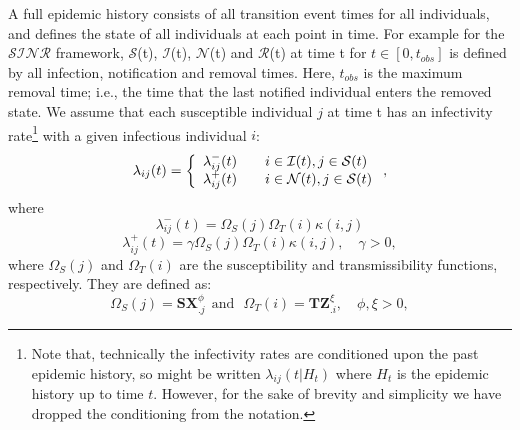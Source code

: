 \documentclass[nojss,shortnames]{jss}
\begin{document}

A full epidemic history consists of all transition event times for all individuals, and defines the state of all individuals at each point in time. For example for the $\mathcal{SINR}$ framework, $\mathcal{S}$(t), $\mathcal{I}$(t), $\mathcal{N}$(t) and $\mathcal{R}$(t) at time t for $t \in [0,t_{obs}]$ is defined by all infection, notification and removal times. Here, $t_{obs}$ is the maximum removal time; i.e., the time that the last notified individual enters the removed state. We assume that each susceptible individual $j$ at time t has an infectivity rate\footnote{Note that, technically the infectivity rates are conditioned upon the past epidemic history, so might be written $\lambda_{ij}(t|H_{t})$ where $H_{t}$ is the epidemic history up to time $t$. However, for the sake of brevity and simplicity we have dropped the conditioning from the notation.} with a given infectious individual $i$: 
\begin{equation}
\lambda_{ij}(t) = \left\{
  \begin{array}{l l}
    \lambda_{ij}^{-}(t)  & \quad i \in \mathcal{I}(t), j \in \mathcal{S}(t)\\
    \lambda_{ij}^{+}(t) & \quad i \in \mathcal{N}(t), j \in \mathcal{S}(t) \\
  \end{array} \right.,
\end{equation}
\noindent where
\[
\lambda_{ij}^{-}(t)  = \Omega_{S}(j) \Omega_{T}(i) \kappa(i,j)
\]
\[
\lambda_{ij}^{+}(t)  = \gamma \Omega_{S}(j) \Omega_{T}(i) \kappa(i,j), \quad \gamma > 0,
\]
\noindent where $\Omega_{S}(j)$ and $\Omega_{T}(i)$ are the susceptibility and transmissibility functions, respectively. They are defined as: 
\[ \Omega_{S}(j) = \mathbf{S} \mathbf{X}_{.j}^{\phi} \ \ \textrm{and}  \ \ \  \Omega_{T}(i) = \mathbf{T} \mathbf{Z}_{.i}^{\xi},  \quad  \phi,\xi >0, \]
\end{document}
